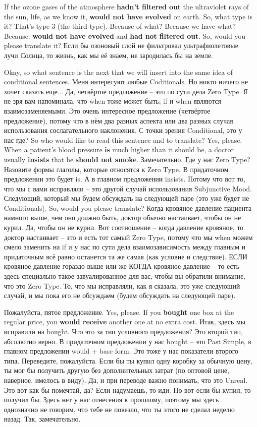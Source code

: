 \documentclass[main.tex]{subfiles}
\begin{document}
If the ozone gases of the atmosphere \textbf{hadn't filtered out} the ultraviolet rays of the sun, life, as we know it, \textbf{would not have evolved} on earth.
So, what type is it?
That's type 3 (the third type).
Because of what?
Because we have what?
Because: \textbf{would not have evolved} and \textbf{had not filtered out}.
So, would you please translate it?
Если бы озоновый слой не фильтровал ультрафиолетовые лучи Солнца, то жизнь, как мы её знаем, не зародилась бы на земле.

Okay, so what sentence is the next that we will insert into the same idea of conditional sentences.
Меня интересуют любые Coditionals.
Но никто ничего не хочет сказать еще...
Да, четвёртое предложение -- это по сути дела Zero Type.
Я не зря вам напоминала, что when тоже может быть;
if и when являются взаимозаменяемыми.
Это очень интересное предложение (четвёртое предложение), потому что в нём два разных аспекта или два разных случая использования сослагательного наклонения.
С точки зрения Conditional, это у нас где?
So who would like to read this sentence and to translate?
Yes, please.
When a patient's blood pressure \textbf{is} much higher than it should be, a doctor usually \textbf{insists} that he \textbf{should not smoke}.
Замечательно.
Где у нас Zero Type?
Назовите формы глаголы, которые относятся к Zero Type.
В придаточном предложении это будет is.
А в главном предложении insists.
Потому что вот то, что мы с вами исправляли -- это другой случай использования Subjunctive Mood.
Следующий, который мы будем обсуждать на следующей паре (это уже будет не Conditionals).
So, would you please translate?
Когда кровяное давление пациента намного выше, чем оно должно быть, доктор обычно настаивает, чтобы он не курил.
Да, чтобы он не курил.
Вот соотношение -- когда давление кровяное, то доктор настаивает -- это и есть тот самый Zero Type, потому что мы when можем смело заменить на if и у нас по сути дела взаимозависимость между главным и придаточным всё равно останется та же самая (как условие и следствие).
ЕСЛИ кровяное давление гораздо выше или же КОГДА кровяное давление -- то есть здесь специально такое завуалированное для вас, чтобы вы обратили внимание, что это Zero Type.
То, что мы исправляли, как я сказала, это уже следующий случай, и мы пока его не обсуждаем (будем обсуждать на следующей паре).

Пожалуйста, пятое предложение.
Yes, please.
If you \textbf{bought} one box at the regular price, you \textbf{would receive} another one at no extra cost.
Итак, здесь мы исправили на bought.
Что это за тип условного предложения?
Это второй тип, абсолютно верно.
В придаточном предложении у нас bought -- это Past Simple, в главном предложении would + base form.
Это тоже у нас показатели второго типа.
Переведите, пожалуйста.
Если бы ты купил одну коробку за обычную цену, ты мог бы получить другую без дополнительных затрат (по оптовой цене, наверное, имелось в виду).
Да, и при переводе важно понимать, что это Unreal.
Это вот как бы помечтай, да?
Если надумаешь, то иди.
Но вот если бы купил, то получил бы.
Здесь нет у нас отнесения к прошлому, поэтому мы здесь однозначно не говорим, что тебе не повезло, что ты этого не сделал неделю назад.
Так, замечательно.
\end{document}
